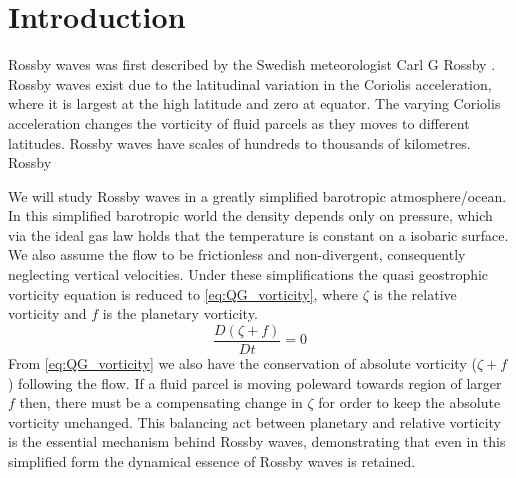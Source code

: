 \section{Introduction}
Rossby waves was first described by the Swedish meteorologist Carl G Rossby
\parencite{Rossby1939}. Rossby waves exist due to the latitudinal variation in
the Coriolis acceleration, where it is largest at the high latitude and zero at
equator. The varying Coriolis acceleration changes the vorticity of fluid
parcels as they moves to different latitudes. Rossby waves have scales of
hundreds to thousands of kilometres. Rossby 

We will study Rossby waves in a greatly simplified 
barotropic atmosphere/ocean. In this simplified barotropic world the density depends only
on pressure, which via the ideal gas law holds that the temperature is constant
on a isobaric surface. We also assume the flow to be frictionless and
non-divergent, consequently neglecting vertical velocities. Under these
simplifications the quasi geostrophic vorticity equation is reduced to
\cref{eq:QG_vorticity}, where $\zeta$ is the relative vorticity and $f$ is the
planetary vorticity. 
\begin{equation}\label{eq:QG_vorticity}
    \frac{D(\zeta + f)}{Dt} = 0
\end{equation}
From \cref{eq:QG_vorticity} we also have the conservation of absolute vorticity
($\zeta + f$) following the flow. If a fluid parcel is moving poleward
towards region of larger $f$ then, there must be a compensating change in
$\zeta$ for order to keep the absolute vorticity unchanged. This balancing act
between planetary and relative vorticity is the essential mechanism behind
Rossby waves, demonstrating that even in this simplified form the dynamical
essence of Rossby waves is retained. 

